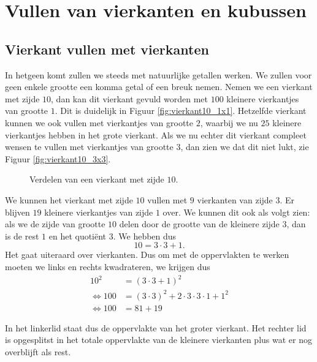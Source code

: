 
\section{Vullen van vierkanten en kubussen}

\subsection{Vierkant vullen met vierkanten}

In hetgeen komt zullen we steeds met natuurlijke getallen werken. We zullen voor geen enkele grootte een komma getal of een breuk nemen. Nemen we een vierkant met zijde $10$, dan kan dit vierkant gevuld worden met $100$ kleinere vierkantjes van grootte $1$. Dit is duidelijk in Figuur \ref{fig:vierkant10_1x1}. Hetzelfde vierkant kunnen we ook vullen met vierkantjes van grootte $2$, waarbij we nu $25$ kleinere vierkantjes hebben in het grote vierkant. Als we nu echter dit vierkant compleet wensen te vullen met vierkantjes van grootte $3$, dan zien we dat dit niet lukt, zie Figuur \ref{fig:vierkant10_3x3}.

\begin{figure}[ht]
  \centering
  \caption{Verdelen van een vierkant met zijde $10$.}
  \label{fig:vierkant10}
\end{figure}

We kunnen het vierkant met zijde $10$ vullen met $9$ vierkanten van zijde $3$. Er blijven $19$ kleinere vierkantjes van zijde $1$ over. We kunnen dit ook als volgt zien: als we de zijde van grootte $10$ delen door de grootte van de kleinere zijde $3$, dan is de rest $1$ en het quoti\"ent $3$. We hebben dus
$$
10 = 3\cdot 3 + 1.
$$
Het gaat uiteraard over vierkanten. Dus om met de oppervlakten te werken moeten we links en rechts kwadrateren, we krijgen dus
\begin{align*}
  10^2  &= (3\cdot 3 + 1)^2\\
  \Leftrightarrow 100   &= (3\cdot 3)^2 + 2\cdot 3\cdot 3\cdot 1 + 1^2\\
  \Leftrightarrow 100   &= 81 + 19
\end{align*}

In het linkerlid staat dus de oppervlakte van het groter vierkant. Het rechter lid is opgesplitst in het totale oppervlakte van de kleinere vierkanten plus wat er nog overblijft als rest.

